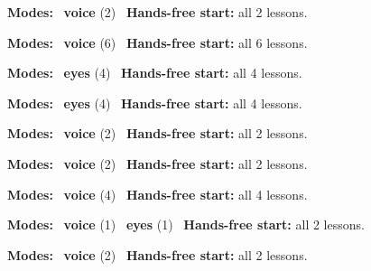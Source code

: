 \expandafter\def\csname hlchaptermodality31\endcsname{%
  {\small\noindent
    \textbf{Modes:} \hlvoicesign{}~\textbf{voice} (2)\quad
    \hlvoicesign{}~\textbf{Hands-free start:} all 2 lessons.%
    \par}\medskip
}

\expandafter\def\csname hlchaptermodality32\endcsname{%
  {\small\noindent
    \textbf{Modes:} \hlvoicesign{}~\textbf{voice} (6)\quad
    \hlvoicesign{}~\textbf{Hands-free start:} all 6 lessons.%
    \par}\medskip
}

\expandafter\def\csname hlchaptermodality33\endcsname{%
  {\small\noindent
    \textbf{Modes:} \hlsightsign{}~\textbf{eyes} (4)\quad
    \hlvoicesign{}~\textbf{Hands-free start:} all 4 lessons.%
    \par}\medskip
}

\expandafter\def\csname hlchaptermodality34\endcsname{%
  {\small\noindent
    \textbf{Modes:} \hlsightsign{}~\textbf{eyes} (4)\quad
    \hlvoicesign{}~\textbf{Hands-free start:} all 4 lessons.%
    \par}\medskip
}

\expandafter\def\csname hlchaptermodality35\endcsname{%
  {\small\noindent
    \textbf{Modes:} \hlvoicesign{}~\textbf{voice} (2)\quad
    \hlvoicesign{}~\textbf{Hands-free start:} all 2 lessons.%
    \par}\medskip
}

\expandafter\def\csname hlchaptermodality36\endcsname{%
  {\small\noindent
    \textbf{Modes:} \hlvoicesign{}~\textbf{voice} (2)\quad
    \hlvoicesign{}~\textbf{Hands-free start:} all 2 lessons.%
    \par}\medskip
}

\expandafter\def\csname hlchaptermodality37\endcsname{%
  {\small\noindent
    \textbf{Modes:} \hlvoicesign{}~\textbf{voice} (4)\quad
    \hlvoicesign{}~\textbf{Hands-free start:} all 4 lessons.%
    \par}\medskip
}

\expandafter\def\csname hlchaptermodality38\endcsname{%
  {\small\noindent
    \textbf{Modes:} \hlvoicesign{}~\textbf{voice} (1) \quad \hlsightsign{}~\textbf{eyes} (1)\quad
    \hlvoicesign{}~\textbf{Hands-free start:} all 2 lessons.%
    \par}\medskip
}

\expandafter\def\csname hlchaptermodality39\endcsname{%
  {\small\noindent
    \textbf{Modes:} \hlvoicesign{}~\textbf{voice} (2)\quad
    \hlvoicesign{}~\textbf{Hands-free start:} all 2 lessons.%
    \par}\medskip
}

